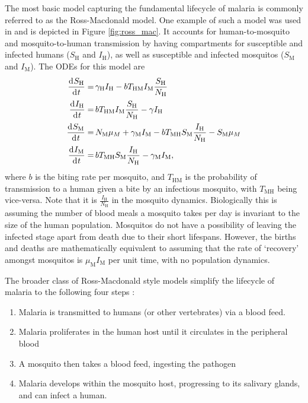 The most basic model capturing the fundamental lifecycle of malaria is
commonly referred to as the Ross-Macdonald model.
One example of such a model was used in \cite{aron_population_1982} and is
depicted in Figure \ref{fig:ross_mac}. It accounts for 
human-to-mosquito and mosquito-to-human transmission by having compartments for
susceptible and infected humans ($S_\mathrm{H}$ and $I_\mathrm{H}$), as well as
susceptible and infected mosquitos ($S_\mathrm{M}$ and $I_\mathrm{M}$).
The ODEs for this model are
\begin{align*}
    \frac{\diff S_\mathrm{H}}{\diff t}
    = & \, \gamma_\mathrm{H}I_\mathrm{H}
    - bT_{\mathrm{HM}}I_\mathrm{M}\frac{S_\mathrm{H}}{N_\mathrm{H}}      \\
    \frac{\diff I_\mathrm{H}}{\diff t}
    = & \, bT_{\mathrm{HM}}I_\mathrm{M}\frac{S_\mathrm{H}}{N_\mathrm{H}}
    - \gamma I_\mathrm{H}                                                \\
    \frac{\diff S_\mathrm{M}}{\diff t}
    = & \, N_\mathrm{M}\mu_M + \gamma_\mathrm{M}I_\mathrm{M}
    - bT_{\mathrm{MH}}S_\mathrm{M}\frac{I_\mathrm{H}}{N_\mathrm{H}}
    - S_\mathrm{M}\mu_M                                                  \\
    \frac{\diff I_\mathrm{M}}{\diff t}
    = & \, bT_{\mathrm{MH}}S_\mathrm{M}\frac{I_\mathrm{H}}{N_\mathrm{H}}
    - \gamma_\mathrm{M}I_\mathrm{M},
\end{align*}
where $b$ is the biting rate per mosquito, and $T_{\mathrm{HM}}$ is the
probability of transmission to a human given a bite by an infectious mosquito,
with $T_{\mathrm{MH}}$ being vice-versa. Note that it is
$\frac{I_\mathrm{H}}{N_\mathrm{H}}$ in the mosquito dynamics. Biologically this
is assuming the number of blood meals a mosquito takes per day is invariant to
the size of the human population. Mosquitos do not have a possibility of
leaving the infected stage apart from death due to
their short lifespans. However, the births and deaths are mathematically equivalent
to assuming that the rate of `recovery' amongst mosquitos is
$\mu_\mathrm{M}I_\mathrm{M}$ per unit time, with no population dynamics.

The broader class of Ross-Macdonald style models simplify the
lifecycle of malaria to the
following four steps \parencite{smith_ross_2012}:
\begin{enumerate}
    \item Malaria is transmitted to humans (or other vertebrates) 
    via a blood feed.
    \item Malaria proliferates in the human host until it circulates in the
          peripheral blood
    \item A mosquito then takes a blood feed, ingesting the pathogen
    \item Malaria develops within the mosquito host, progressing to its
          salivary glands, and can infect a human.
\end{enumerate}


